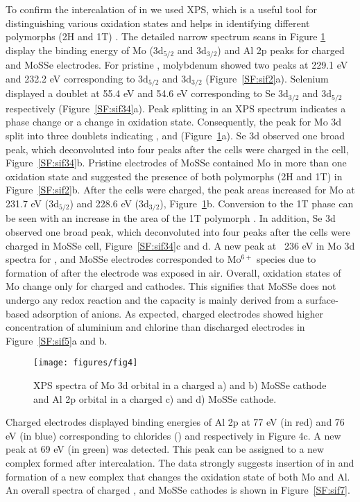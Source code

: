 To confirm the intercalation of  in  we used XPS, which is a useful tool for distinguishing various oxidation states and helps in identifying different polymorphs (2H and 1T) \cite{fan_hybrid_2017}. The detailed narrow spectrum scans in Figure \ref{figures:fig4} display the binding energy of Mo (3d$_{5/2}$ and 3d$_{3/2}$) and Al 2p peaks for charged  and MoSSe electrodes. For pristine , molybdenum showed two peaks at 229.1 eV and 232.2 eV corresponding to 3d$_{5/2}$ and 3d$_{3/2}$ (Figure\ \ref{SF:sif2}a). Selenium displayed a doublet at 55.4 eV and 54.6 eV corresponding to Se 3d$_{3/2}$ and 3d$_{5/2}$ respectively (Figure\ \ref{SF:sif34}a). Peak splitting in an XPS spectrum indicates a phase change or a change in oxidation state. Consequently, the peak for Mo 3d split into three doublets indicating ,  and  (Figure\ \ref{figures:fig4}a). Se 3d observed one broad peak, which deconvoluted into four peaks after the cells were charged in the  cell, Figure\ \ref{SF:sif34}b. Pristine electrodes of MoSSe contained Mo in more than one oxidation state and suggested the presence of both polymorphs (2H and 1T) in Figure\ \ref{SF:sif2}b. After the cells were charged, the peak areas increased for Mo at 231.7 eV (3d$_{5/2}$) and 228.6 eV (3d$_{3/2}$), Figure\ \ref{figures:fig4}b. Conversion to the 1T phase can be seen with an increase in the area of the 1T polymorph \cite{fan_hybrid_2017}. In addition, Se 3d observed one broad peak, which deconvoluted into four peaks after the cells were charged in MoSSe cell, Figure\ \ref{SF:sif34}c and d. A new peak at ~236 eV in Mo 3d spectra for ,  and MoSSe electrodes corresponded to Mo$^{6+}$ species due to formation of  after the electrode was exposed in air. Overall, oxidation states of Mo change only for charged  and  cathodes. This signifies that MoSSe does not undergo any redox reaction and the capacity is mainly derived from a surface-based adsorption of anions. As expected, charged electrodes showed higher concentration of aluminium and chlorine than discharged electrodes in Figure\ \ref{SF:sif5}a and b. 
\begin{figure}[htb!]
\centering
\texttt{[image: figures/fig4]}
\caption{XPS spectra of Mo 3d orbital in a charged a)  and b) MoSSe cathode and Al 2p orbital in a charged c)  and d) MoSSe cathode.}
\label{figures:fig4}
\end{figure}

Charged  electrodes displayed binding energies of Al 2p at 77 eV (in red) and 76 eV (in blue) corresponding to chlorides () and  respectively in Figure 4c. A new peak at 69 eV (in green) was detected. This peak can be assigned to a new complex formed after  intercalation. The data strongly suggests insertion of  in  and formation of a new complex that changes the oxidation state of both Mo and Al. An overall spectra of charged ,  and MoSSe cathodes is shown in Figure\ \ref{SF:sif7}.

